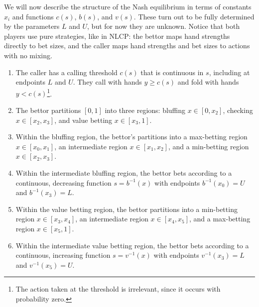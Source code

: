 \documentclass[../../main/main.tex]{subfiles}
\begin{document}
We will now describe the structure of the Nash equilibrium in terms of constants $x_i$ and functions $c(s)$, $b(s)$, and $v(s)$. These turn out to be fully determined by the parameters $L$ and $U$, but for now they are unknown. Notice that both players use pure strategies, like in NLCP: the bettor maps hand strengths directly to bet sizes, and the caller maps hand strengths and bet sizes to actions with no mixing.

    \begin{enumerate}
        \item The caller has a calling threshold $c(s)$ that is continuous in $s$, including at endpoints $L$ and $U$. They call with hands $y \geq c(s)$ and fold with hands $y < c(s)$\footnote{The action taken at the threshold is irrelevant, since it occurs with probability zero.}.
        \item The bettor partitions $[0,1]$ into three regions: bluffing $x \in [0,x_2]$, checking $x \in [x_2,x_3]$, and value betting $x \in [x_3,1]$.
        \item Within the bluffing region, the bettor's partitions into a max-betting region $x \in [x_0,x_1]$, an intermediate region $x \in [x_1,x_2]$, and a min-betting region $x \in [x_2,x_3]$.
        \item Within the intermediate bluffing region, the bettor bets according to a continuous, decreasing function $s=b^{-1}(x)$ with endpoints $b^{-1}(x_0)=U$ and $b^{-1}(x_3)=L$.
        \item Within the value betting region, the bettor partitions into a min-betting region $x \in [x_3,x_4]$, an intermediate region $x \in [x_4,x_5]$, and a max-betting region $x \in [x_5,1]$.
        \item Within the intermediate value betting region, the bettor bets according to a continuous, increasing function $s=v^{-1}(x)$ with endpoints $v^{-1}(x_3)=L$ and $v^{-1}(x_5)=U$.
    \end{enumerate}



\end{document}
